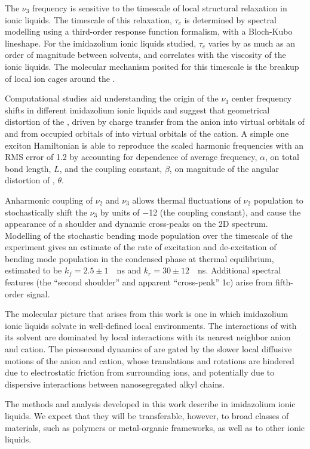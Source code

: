 The $\nu_3$ frequency is sensitive to the timescale of local structural relaxation in ionic liquids. The timescale of this relaxation, $\tau_c$ is determined by spectral modelling using a third-order response function formalism, with a Bloch-Kubo lineshape. For the imidazolium ionic liquids studied, $\tau_c$ varies by as much as an order of magnitude between solvents, and correlates with the viscosity of the ionic liquids. The molecular mechanism posited for this timescale is the breakup of local ion cages around the .

Computational studies aid understanding the origin of the $\nu_3$ center frequency shifts in different imidazolium ionic liquids and suggest that geometrical distortion of the , driven by charge transfer from the anion into virtual orbitals of  and from occupied orbitals of  into virtual orbitals of the cation. A simple one exciton Hamiltonian is able to reproduce the scaled harmonic frequencies with an RMS error of \SI{1.2}{\wavenumber} by accounting for dependence of average frequency, $\alpha$, on total bond length, $L$, and the coupling constant, $\beta$, on magnitude of the angular distortion of , $\theta$.

Anharmonic coupling of $\nu_2$ and $\nu_3$ allows thermal fluctuations of $\nu_2$ population to stochastically shift the  $\nu_3$ by units of \SI{-12}{\wavenumber} (the coupling constant), and cause the appearance of a shoulder and dynamic cross-peaks on the 2D spectrum. Modelling of the stochastic bending mode population over the timescale of the experiment gives an estimate of the rate of excitation and de-excitation of bending mode population in the condensed phase at thermal equilibrium, estimated to be $k_{f} = 2.5 \pm 1$~\si{\per\ns} and $k_r = 30\pm12$~\si{\per\ns}. Additional spectral features (the ``second shoulder'' and apparent ``cross-peak'' 1c) arise from fifth-order signal.

The molecular picture that arises from this work is one in which imidazolium ionic liquids solvate  in well-defined local environments. The interactions of  with its solvent are dominated by local interactions with its nearest neighbor anion and cation. The picosecond dynamics of  are gated by the slower local diffusive motions of the anion and cation, whose translations and rotations are hindered due to electrostatic friction from surrounding ions, and potentially due to dispersive interactions between nanosegregated alkyl chains. 

The methods and analysis developed in this work describe  in imidazolium ionic liquids. We expect that they will be transferable, however, to broad classes of materials, such as polymers or metal-organic frameworks, as well as to other ionic liquids.
